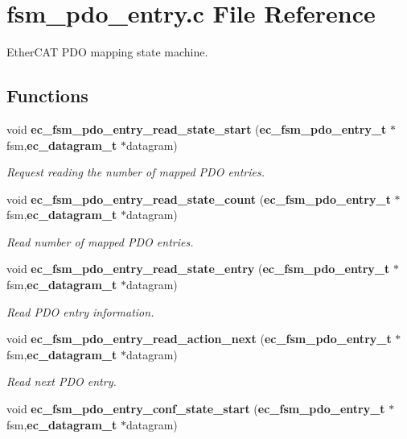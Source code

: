 \section{fsm\-\_\-pdo\-\_\-entry.\-c \-File \-Reference}
\label{fsm__pdo__entry_8c}


\-Ether\-C\-A\-T \-P\-D\-O mapping state machine.  


\subsection*{\-Functions}
\begin{DoxyCompactItemize}
\item 
void {\bf ec\-\_\-fsm\-\_\-pdo\-\_\-entry\-\_\-read\-\_\-state\-\_\-start} ({\bf ec\-\_\-fsm\-\_\-pdo\-\_\-entry\-\_\-t} $\ast$fsm,{\bf ec\-\_\-datagram\-\_\-t} $\ast$datagram)
\begin{DoxyCompactList}\small\item\em \-Request reading the number of mapped \-P\-D\-O entries. \end{DoxyCompactList}\item 
void {\bf ec\-\_\-fsm\-\_\-pdo\-\_\-entry\-\_\-read\-\_\-state\-\_\-count} ({\bf ec\-\_\-fsm\-\_\-pdo\-\_\-entry\-\_\-t} $\ast$fsm,{\bf ec\-\_\-datagram\-\_\-t} $\ast$datagram)
\begin{DoxyCompactList}\small\item\em \-Read number of mapped \-P\-D\-O entries. \end{DoxyCompactList}\item 
void {\bf ec\-\_\-fsm\-\_\-pdo\-\_\-entry\-\_\-read\-\_\-state\-\_\-entry} ({\bf ec\-\_\-fsm\-\_\-pdo\-\_\-entry\-\_\-t} $\ast$fsm,{\bf ec\-\_\-datagram\-\_\-t} $\ast$datagram)
\begin{DoxyCompactList}\small\item\em \-Read \-P\-D\-O entry information. \end{DoxyCompactList}\item 
void {\bf ec\-\_\-fsm\-\_\-pdo\-\_\-entry\-\_\-read\-\_\-action\-\_\-next} ({\bf ec\-\_\-fsm\-\_\-pdo\-\_\-entry\-\_\-t} $\ast$fsm,{\bf ec\-\_\-datagram\-\_\-t} $\ast$datagram)
\begin{DoxyCompactList}\small\item\em \-Read next \-P\-D\-O entry. \end{DoxyCompactList}\item 
void {\bf ec\-\_\-fsm\-\_\-pdo\-\_\-entry\-\_\-conf\-\_\-state\-\_\-start} ({\bf ec\-\_\-fsm\-\_\-pdo\-\_\-entry\-\_\-t} $\ast$fsm,{\bf ec\-\_\-datagram\-\_\-t} $\ast$datagram)

\end{DoxyCompactItemize}
